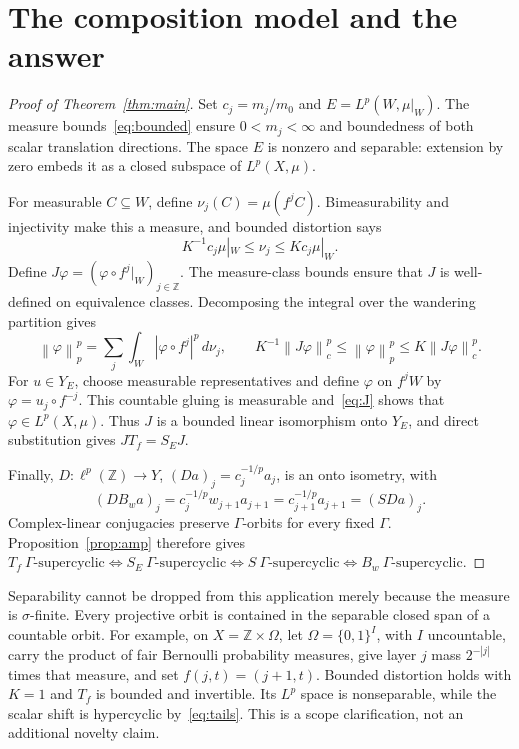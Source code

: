 \documentclass[11pt]{article}
\theoremstyle{remark}
\newcommand{\Z}{\mathbb Z}
\newcommand{\norm}[1]{\left\|#1\right\|}
\newcommand{\abs}[1]{\left|#1\right|}
\newcommand{\gs}{\Gamma\text{-supercyclic}}
\begin{document}
\section{The composition model and the answer}

\begin{proof}[Proof of Theorem~\ref{thm:main}]
Set $c_j=m_j/m_0$ and $E=L^p(W,\mu|_W)$. The measure bounds~\eqref{eq:bounded} ensure $0<m_j<\infty$ and boundedness of both scalar translation directions. The space $E$ is nonzero and separable: extension by zero embeds it as a closed subspace of $L^p(X,\mu)$.

For measurable $C\subseteq W$, define $\nu_j(C)=\mu(f^jC)$. Bimeasurability and injectivity make this a measure, and bounded distortion says
\[
K^{-1}c_j\mu|_W\le\nu_j\le Kc_j\mu|_W.
\]
Define $J\varphi=(\varphi\circ f^j|_W)_{j\in\Z}$. The measure-class bounds ensure that $J$ is well-defined on equivalence classes. Decomposing the integral over the wandering partition gives
\begin{equation}\label{eq:J}
\norm{\varphi}_p^p
=\sum_j\int_W\abs{\varphi\circ f^j}^p\,d\nu_j,
\qquad
K^{-1}\norm{J\varphi}_c^p\le\norm{\varphi}_p^p\le K\norm{J\varphi}_c^p.
\end{equation}
For $u\in Y_E$, choose measurable representatives and define $\varphi$ on $f^jW$ by $\varphi=u_j\circ f^{-j}$. This countable gluing is measurable and~\eqref{eq:J} shows that $\varphi\in L^p(X,\mu)$. Thus $J$ is a bounded linear isomorphism onto $Y_E$, and direct substitution gives $JT_f=S_EJ$.

Finally, $D:\ell^p(\Z)\to Y$, $(Da)_j=c_j^{-1/p}a_j$, is an onto isometry, with
\[
(DB_wa)_j=c_j^{-1/p}w_{j+1}a_{j+1}
=c_{j+1}^{-1/p}a_{j+1}=(SDa)_j.
\]
Complex-linear conjugacies preserve $\Gamma$-orbits for every fixed $\Gamma$. Proposition~\ref{prop:amp} therefore gives $T_f\ \gs\iff S_E\ \gs\iff S\ \gs\iff B_w\ \gs$.
\end{proof}

Separability cannot be dropped from this application merely because the measure is $\sigma$-finite. Every projective orbit is contained in the separable closed span of a countable orbit. For example, on $X=\Z\times\Omega$, let $\Omega=\{0,1\}^I$, with $I$ uncountable, carry the product of fair Bernoulli probability measures, give layer $j$ mass $2^{-|j|}$ times that measure, and set $f(j,t)=(j+1,t)$. Bounded distortion holds with $K=1$ and $T_f$ is bounded and invertible. Its $L^p$ space is nonseparable, while the scalar shift is hypercyclic by~\eqref{eq:tails}. This is a scope clarification, not an additional novelty claim.
\end{document}
